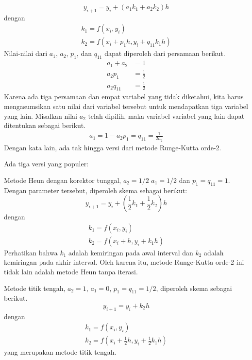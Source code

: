 \begin{equation*}
y_{i+1} = y_i + (a_1 k_1 + a_2 k_2) h
\end{equation*}
dengan
\begin{align*}
k_1 = f(x_i, y_i) \\
k_2 = f(x_i + p_1 h, y_i + q_{11} k_1 h)
\end{align*}
Nilai-nilai dari $a_1$, $a_2$, $p_1$, dan $q_{11}$ dapat diperoleh dari persamaan
berikut.
\begin{align*}
a_1 + a_2  & = 1 \\
a_2 p_1    & = \frac{1}{2} \\
a_2 q_{11} & = \frac{1}{2}
\end{align*}
Karena ada tiga persamaan dan empat variabel yang tidak diketahui, kita harus mengasumsikan satu
nilai dari variabel tersebut untuk mendapatkan tiga variabel yang lain.
Misalkan nilai $a_2$ telah dipilih, maka variabel-variabel yang lain
dapat ditentukan sebagai berikut.
\begin{align*}
a_1 = 1 - a_2
p_1 = q_{11} = \frac{1}{2a_2}
\end{align*}
Dengan kata lain, ada tak hingga versi dari metode Runge-Kutta orde-2.

Ada tiga versi yang populer:

Metode Heun dengan korektor tunggal, $a_2 = 1/2$
$a_1 = 1/2$ dan $p_1 = q_{11} = 1$. Dengan parameter tersebut, diperoleh skema
sebagai berikut:
\begin{equation*}
y_{i+1} = y_{i} + \left(
\frac{1}{2}k_1 + \frac{1}{2}k_2
\right)h
\end{equation*}
dengan
\begin{align*}
k_1 = f(x_i, y_i) \\
k_2 = f(x_i + h, y_i + k_1 h)
\end{align*}
Perhatikan bahwa $k_1$ adalah kemiringan pada awal interval dan $k_2$ adalah
kemiringan pada akhir interval. Oleh karena itu, metode Runge-Kutta orde-2 ini
tidak lain adalah metode Heun tanpa iterasi.


Metode titik tengah, $a_2 = 1$, $a_1 = 0$, $p_1 = q_{11} = 1/2$, diperoleh
skema sebagai berikut.
\begin{equation*}
y_{i+1} = y_i + k_2 h
\end{equation*}
dengan
\begin{align*}
k_1 = f(x_i, y_i) \\
k_2 = f\left( x_i + \frac{1}{2}h, y_i + \frac{1}{2} k_1 h \right)
\end{align*}
yang merupakan metode titik tengah.

